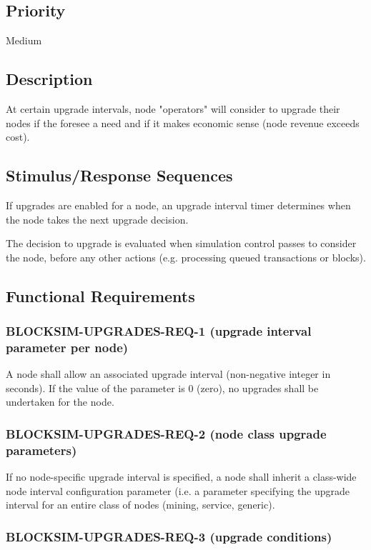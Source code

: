\documentclass{scrreprt}
\begin{document}
\subsection{Priority}

Medium

\subsection{Description}

At certain upgrade intervals, node "operators" will consider to upgrade
their nodes if the foresee a need and if it makes economic sense
(node revenue exceeds cost).


\subsection{Stimulus/Response Sequences}

If upgrades are enabled for a node, an upgrade interval timer determines
when the node takes the next upgrade decision.

The decision to upgrade is evaluated when simulation control passes to
consider the node, before any other actions (e.g. processing queued
transactions or blocks).


\subsection{Functional Requirements}

\subsubsection{BLOCKSIM-UPGRADES-REQ-1 (upgrade interval parameter per node)}

A node shall allow an associated upgrade interval (non-negative integer in seconds).
If the value of the parameter is 0 (zero), no upgrades shall be undertaken
for the node.

\subsubsection{BLOCKSIM-UPGRADES-REQ-2 (node class upgrade parameters)}

If no node-specific upgrade interval is specified, a node shall inherit
a class-wide node interval configuration parameter (i.e. a parameter
specifying the upgrade interval for an entire class of nodes (mining,
service, generic).

\subsubsection{BLOCKSIM-UPGRADES-REQ-3 (upgrade conditions)}
\end{document}
